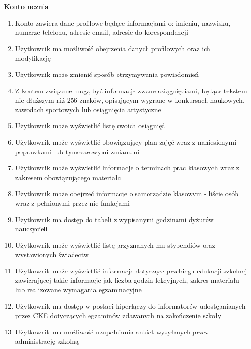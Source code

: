 \documentclass{article}
\begin{document}
\textbf{Konto ucznia}
\begin{enumerate}
	\item Konto zawiera dane profilowe będące informacjami o: imieniu, nazwisku, numerze telefonu, adresie email, adresie do korespondencji
	\item Użytkownik ma możliwość obejrzenia danych profilowych oraz ich modyfikację
	\item Użytkownik może zmienić sposób otrzymywania powiadomień
	\item Z kontem związane mogą być informacje zwane osiągnięciami, będące tekstem nie dłuższym niż 256 znaków, opisującym wygrane w konkursach naukowych, zawodach sportowych lub osiągnięcia artystyczne
	\item Użytkownik może wyświetlić listę swoich osiągnięć
	\item Użytkownik może wyświetlić obowiązujący plan zajęć wraz z naniesionymi poprawkami lub tymczasowymi zmianami
	\item Użytkownik może wyświetlić informacje o terminach prac klasowych wraz z zakresem obowiązującego materiału
	\item Użytkownik może obejrzeć informacje o samorządzie klasowym - liście osób wraz z pełnionymi przez nie funkcjami
	\item Użytkownik ma dostęp do tabeli z wypisanymi godzinami dyżurów nauczycieli
	\item Użytkownik może wyświetlić listę przyznanych mu stypendiów oraz wystawionych świadectw
	\item Użytkownik może wyświetlić informacje dotyczące przebiegu edukacji szkolnej zawierającej takie informacje jak liczba godzin lekcyjnych, zakres materiału lub realizowane wymagania egzaminacyjne
	\item Użytkownik ma dostęp w postaci hiperłączy do informatorów udostępnianych przez CKE dotyczących egzaminów zdawanych na zakończenie szkoły
	\item Użytkownik ma możliwość uzupełniania ankiet wysyłanych przez administrację szkolną

\end{enumerate}
\end{document}
